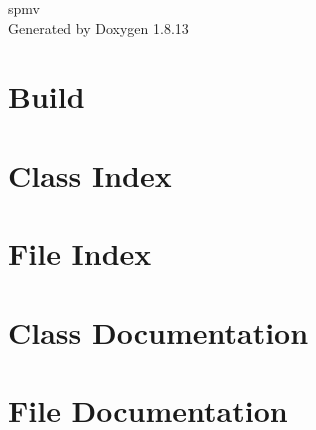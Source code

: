 \documentclass[twoside]{book}
\newcommand{\+}{\discretionary{\mbox{\scriptsize$\hookleftarrow$}}{}{}}
\newcommand{\clearemptydoublepage}{%
  \newpage{\pagestyle{empty}\cleardoublepage}%
}
\begin{document}
\hypersetup{pageanchor=false,
             bookmarksnumbered=true,
             pdfencoding=unicode
            }
\begin{titlepage}
\vspace*{7cm}
\begin{center}%
{\Large spmv }\\
\vspace*{1cm}
{\large Generated by Doxygen 1.8.13}\\
\end{center}
\end{titlepage}
\clearemptydoublepage
{}
\tableofcontents
\clearemptydoublepage
{}
\hypersetup{pageanchor=true}

\chapter{Build}
\label{md__home_tau_public_html_lecture_parallel_distributed_2018_parallel-distributed-handson_03spmv_README}

\chapter{Class Index}

\chapter{File Index}

\chapter{Class Documentation}














\chapter{File Documentation}


























\backmatter
\newpage
{}
\clearemptydoublepage
{}
\printindex
\end{document}
